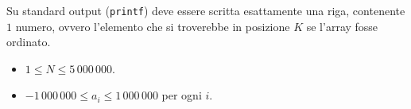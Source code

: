 \OutputFile
Su standard output (\texttt{printf}) deve essere scritta esattamente una riga,
contenente $1$ numero, ovvero l'elemento che si troverebbe in posizione $K$ se l'array fosse ordinato.
	


\Constraints

\begin{itemize}[nolistsep, itemsep=2mm]
    \item $1 \leq N \leq 5\,000\,000$.
    \item $-1\,000\,000 \leq a_i \leq 1\,000\,000$ per ogni $i$.
\end{itemize}



\Examples

\begin{example}
%
\end{example}




